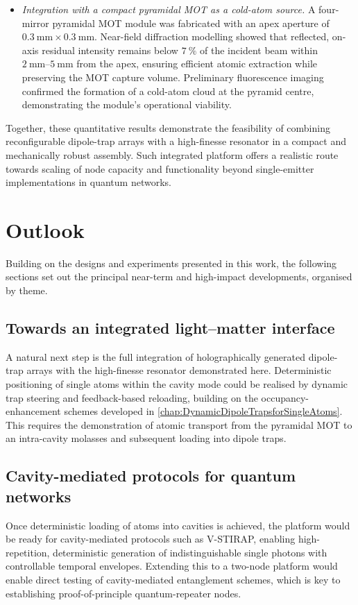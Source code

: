 \documentclass[../Thesis-IJspeert.tex]{subfiles}
\begin{document}
\begin{itemize}[leftmargin=*, labelsep=1em]
\item \emph{Integration with a compact pyramidal MOT as a cold-atom source.}  
A four-mirror pyramidal MOT module was fabricated with an apex aperture of $\SI{0.3}{\milli\metre}\times\SI{0.3}{\milli\metre}$. Near-field diffraction modelling showed that reflected, on-axis residual intensity remains below $\SI{7}{\percent}$ of the incident beam within $\SIrange{2}{5}{\milli\metre}$ from the apex, ensuring efficient atomic extraction while preserving the MOT capture volume. Preliminary fluorescence imaging confirmed the formation of a cold-atom cloud at the pyramid centre, demonstrating the module's operational viability.
\end{itemize}
Together, these quantitative results demonstrate the feasibility of combining reconfigurable dipole-trap arrays with a high-finesse resonator in a compact and mechanically robust assembly. Such integrated platform offers a realistic route towards scaling of node capacity and functionality beyond single-emitter implementations in quantum networks.

\section{Outlook}
Building on the designs and experiments presented in this work, the following sections set out the principal near-term and high-impact developments, organised by theme.

\subsection{Towards an integrated light–matter interface}
A natural next step is the full integration of holographically generated dipole-trap arrays with the high-finesse resonator demonstrated here. Deterministic positioning of single atoms within the cavity mode could be realised by dynamic trap steering and feedback-based reloading, building on the occupancy-enhancement schemes developed in \autoref{chap:DynamicDipoleTrapsforSingleAtoms}. This requires the demonstration of atomic transport from the pyramidal MOT to an intra-cavity molasses and subsequent loading into dipole traps.

\subsection{Cavity-mediated protocols for quantum networks}
Once deterministic loading of atoms into cavities is achieved, the platform would be ready for cavity-mediated protocols such as V-STIRAP, enabling high-repetition, deterministic generation of indistinguishable single photons with controllable temporal envelopes. Extending this to a two-node platform would enable direct testing of cavity-mediated entanglement schemes, which is key to establishing proof-of-principle quantum-repeater nodes.
\end{document}
